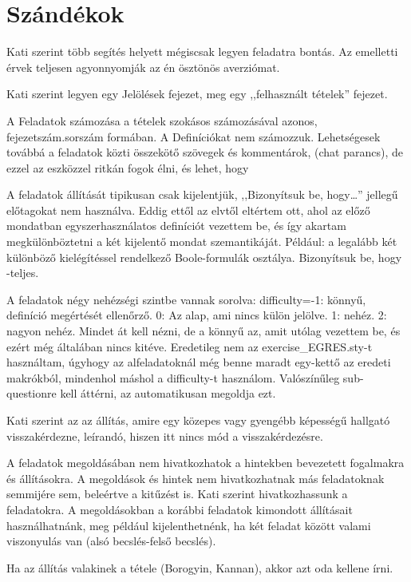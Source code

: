 \chapter{Szándékok}

Kati szerint több segítés helyett mégiscsak legyen feladatra bontás. Az emelletti érvek teljesen agyonnyomják az én ösztönös averziómat.

Kati szerint legyen egy Jelölések fejezet, meg egy ,,felhasznált tételek'' fejezet.

A Feladatok számozása a tételek szokásos számozásával azonos, fejezetszám.sorszám formában. A Definíciókat nem számozzuk. Lehetségesek továbbá a feladatok közti összekötő szövegek és kommentárok, (chat parancs), de ezzel az eszközzel ritkán fogok élni, és lehet, hogy

A feladatok állítását tipikusan csak kijelentjük, ,,Bizonyítsuk be, hogy\dots'' jellegű előtagokat nem használva. Eddig ettől az elvtől eltértem ott, ahol az előző mondatban egyszerhasználatos definíciót vezettem be, és így akartam megkülönböztetni a két kijelentő mondat szemantikáját. Például:  a legalább két különböző kielégítéssel rendelkező Boole-formulák
osztálya. Bizonyítsuk be, hogy  \NP-teljes.

A feladatok négy nehézségi szintbe vannak sorolva: difficulty=-1: könnyű, definíció megértését ellenőrző. 0: Az alap, ami nincs külön jelölve. 1: nehéz. 2: nagyon nehéz. Mindet át kell nézni, de a könnyű az, amit utólag vezettem be, és ezért még általában nincs kitéve. Eredetileg nem az exercise\_EGRES.sty-t használtam, úgyhogy az alfeladatoknál még benne maradt egy-kettő az eredeti \hard makrókból, mindenhol máshol a difficulty-t használom. Valószínűleg sub-questionre kell áttérni, az automatikusan megoldja ezt.

Kati szerint az az állítás, amire egy közepes vagy gyengébb képességű hallgató visszakérdezne, leírandó, hiszen itt nincs mód a visszakérdezésre.

A feladatok megoldásában nem hivatkozhatok a hintekben bevezetett fogalmakra és állításokra. A megoldások és hintek nem hivatkozhatnak más feladatoknak semmijére sem, beleértve a kitűzést is. Kati szerint hivatkozhassunk a feladatokra. A megoldásokban a korábbi feladatok kimondott állításait használhatnánk, meg például kijelenthetnénk, ha két feladat között valami viszonyulás van (alsó becslés-felső becslés).

Ha az állítás valakinek a tétele (Borogyin, Kannan), akkor azt oda kellene írni.


